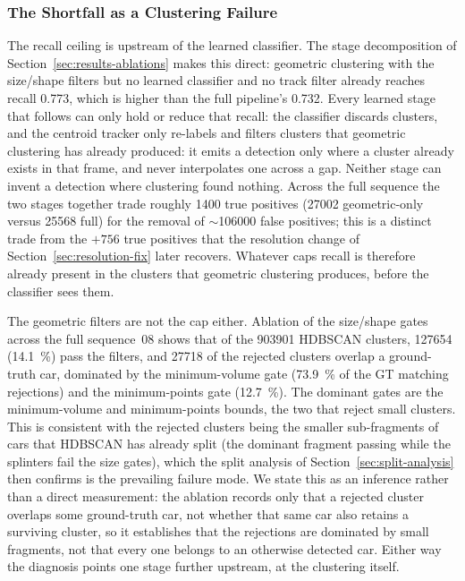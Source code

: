 \subsubsection{The Shortfall as a Clustering Failure}
\label{sec:recall-diagnosis}

The recall ceiling is upstream of the learned classifier. The stage decomposition
of Section~\ref{sec:results-ablations} makes this direct: geometric clustering with the
size/shape filters but no learned classifier and no track filter
already reaches recall \num{0.773}, which is higher than the full pipeline's
\num{0.732}. Every learned stage that follows can only hold or reduce that recall:
the classifier discards clusters, and the centroid tracker only re-labels and
filters clusters that geometric clustering has already produced: it emits a
detection only where a cluster already exists in that frame, and never
interpolates one across a gap. Neither stage can invent a detection where clustering
found nothing. Across the full sequence the two stages together trade roughly
\num{1400} true positives (\num{27002} geometric-only versus \num{25568} full) for the removal of $\sim$\num{106000} false positives; this is a
distinct trade from the $+\num{756}$ true positives that the resolution change of
Section~\ref{sec:resolution-fix} later recovers. Whatever caps recall is therefore
already present in the clusters that geometric clustering produces, before the
classifier sees them.

The geometric filters are not the cap either. Ablation of the
size/shape gates across the full sequence~08 shows that of the
\num{903901} HDBSCAN clusters, \num{127654} (\SI{14.1}{\percent})
pass the filters, and \num{27718} of the rejected clusters overlap a ground-truth
car, dominated by the minimum-volume gate (\SI{73.9}{\percent} of the GT matching
rejections) and the minimum-points gate (\SI{12.7}{\percent}). The dominant gates are
the minimum-volume and minimum-points bounds, the two that reject small
clusters. This is consistent with the rejected clusters being the smaller
sub-fragments of cars that HDBSCAN has already split (the dominant fragment passing
while the splinters fail the size gates), which the split analysis of
Section~\ref{sec:split-analysis} then confirms is the prevailing failure mode. We
state this as an inference rather than a direct measurement: the ablation records
only that a rejected cluster overlaps some ground-truth car,
not whether that same car also retains a
surviving cluster, so it establishes that the rejections are dominated by small
fragments, not that every one belongs to an otherwise detected car. Either way the
diagnosis points one stage further upstream, at the clustering itself.

